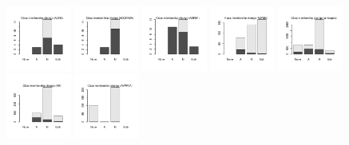\documentclass[utf8]{frontiersSCNS} %
\begin{document}
\begin{figure}[h!]
\includegraphics[width=0.19\textwidth]{figures/validation_plots/ache_0p9_valplot.pdf}
\includegraphics[width=0.19\textwidth]{figures/validation_plots/adora2a_0p9_valplot.pdf}
\includegraphics[width=0.19\textwidth]{figures/validation_plots/adrb1_0p9_valplot.pdf}
\includegraphics[width=0.19\textwidth]{figures/validation_plots/adrb2_0p9_valplot.pdf}
\includegraphics[width=0.19\textwidth]{figures/validation_plots/alltargets_0p9_valplot.pdf}
\includegraphics[width=0.19\textwidth]{figures/validation_plots/ar_0p9_valplot.pdf}
\includegraphics[width=0.19\textwidth]{figures/validation_plots/avpr1a_0p9_valplot.pdf}

\end{figure}
\end{document}
